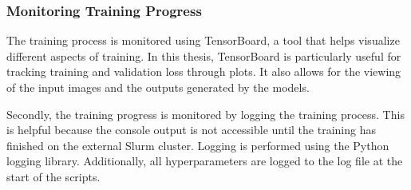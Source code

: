     \subsubsection{Monitoring Training Progress}
    
    The training process is monitored using TensorBoard, a tool that helps visualize different aspects of training. In this thesis, TensorBoard is particularly useful for tracking training and validation loss through plots. It also allows for the viewing of the input images and the outputs generated by the models.

    Secondly, the training progress is monitored by logging the training process. This is helpful because the console output is not accessible until the training has finished on the external Slurm cluster. Logging is performed using the Python logging library. Additionally, all hyperparameters are logged to the log file at the start of the scripts.





